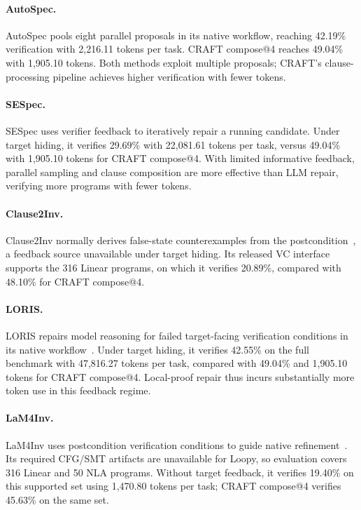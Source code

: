 \paragraph{AutoSpec.}
AutoSpec pools eight parallel proposals in its native workflow, reaching
42.19\% verification with 2,216.11 tokens per task. CRAFT compose@4 reaches
49.04\% with 1,905.10 tokens. Both methods exploit multiple proposals;
CRAFT's clause-processing pipeline achieves higher verification with fewer
tokens.

\paragraph{SESpec.}
SESpec uses verifier feedback to iteratively repair a running candidate.
Under target hiding, it verifies 29.69\% with 22,081.61 tokens per task,
versus 49.04\% with 1,905.10 tokens for CRAFT compose@4. With limited
informative feedback, parallel sampling and clause composition are more
effective than LLM repair, verifying more programs with fewer tokens.

\paragraph{Clause2Inv.}
Clause2Inv normally derives false-state counterexamples from the
postcondition~\citep{cao2025clause2inv}, a feedback source unavailable under
target hiding. Its released VC interface supports the 316 Linear programs,
on which it verifies 20.89\%, compared with 48.10\% for CRAFT compose@4.

\paragraph{LORIS.}
LORIS repairs model reasoning for failed target-facing verification
conditions in its native workflow~\citep{li2026loris}. Under target hiding,
it verifies 42.55\% on the full benchmark with 47,816.27 tokens per task,
compared with 49.04\% and 1,905.10 tokens for CRAFT compose@4. Local-proof
repair thus incurs substantially more token use in this feedback regime.

\paragraph{LaM4Inv.}
LaM4Inv uses postcondition verification conditions to guide native
refinement~\citep{wu2024lam4inv}. Its required CFG/SMT artifacts are
unavailable for Loopy, so evaluation covers 316 Linear and 50 NLA programs.
Without target feedback, it verifies 19.40\% on this supported set using
1,470.80 tokens per task; CRAFT compose@4 verifies 45.63\% on the same set.

